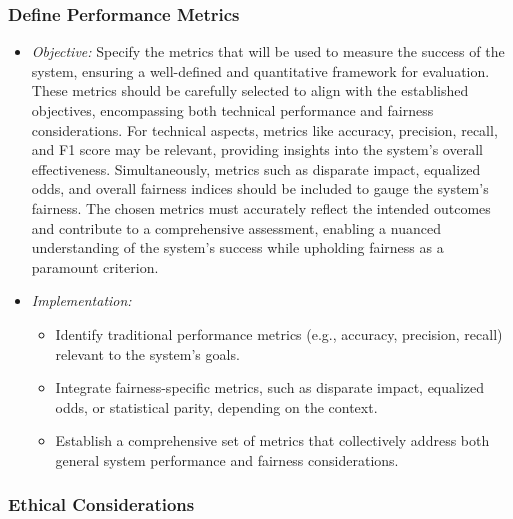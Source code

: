 \documentclass[12pt,a4paper,openright,twoside]{book}
\begin{document}
\subsubsection{Define Performance Metrics}

\begin{itemize}

    \item \emph{Objective:} Specify the metrics that will be used to measure the success of the system, ensuring a well-defined and quantitative framework for evaluation. These metrics should be carefully selected to align with the established objectives, encompassing both technical performance and fairness considerations. For technical aspects, metrics like accuracy, precision, recall, and F1 score may be relevant, providing insights into the system's overall effectiveness. Simultaneously, metrics such as disparate impact, equalized odds, and overall fairness indices should be included to gauge the system's fairness. The chosen metrics must accurately reflect the intended outcomes and contribute to a comprehensive assessment, enabling a nuanced understanding of the system's success while upholding fairness as a paramount criterion.
    
    \item \emph{Implementation:}
        
    \begin{itemize}
            
        \item Identify traditional performance metrics (e.g., accuracy, precision, recall) relevant to the system's goals.
            
        \item Integrate fairness-specific metrics, such as disparate impact, equalized odds, or statistical parity, depending on the context.
            
        \item Establish a comprehensive set of metrics that collectively address both general system performance and fairness considerations.

    \end{itemize}

\end{itemize}

\subsubsection{Ethical Considerations}
\end{document}
